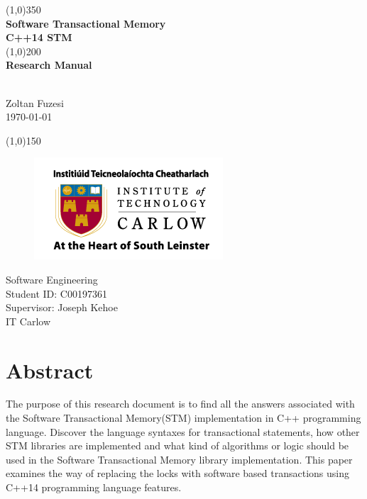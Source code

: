 \documentclass[12pt]{article}
\begin{document}
\begin{titlepage}
	\begin{center}
	\line(1,0){350}\\
	[0.3 cm]
	\huge{\textbf{Software Transactional Memory\\[0.3 cm]C++14 STM\\ }} 
	\line(1,0){200}\\
	[0.3 cm]
	\huge{\textbf{Research Manual }} 
		\begin{LARGE}
		\\[0.3 cm]Zoltan Fuzesi\\
		\today
		\end{LARGE}
		
		\begin{LARGE}
		\line(1,0){150}\\
		[1.0 cm]
\begin{figure}[h!]
\centering
\includegraphics[scale=0.7]{Pictures/carlow.png}
\end{figure}
	
		
		Software Engineering\\
		Student ID: C00197361\\
		Supervisor: Joseph Kehoe\\
		IT Carlow
		\end{LARGE}
		
	\end{center}
\end{titlepage}

\tableofcontents

\clearpage
\section{Abstract}
The purpose of this research document is to find all the answers associated with the Software Transactional Memory(STM) implementation in C++ programming language. Discover the language syntaxes for transactional statements, how other STM libraries are implemented and what kind of algorithms or logic  should be used in the Software Transactional Memory library implementation. This paper examines the way of replacing the locks with software based transactions using C++14 programming language features.
\end{document}
